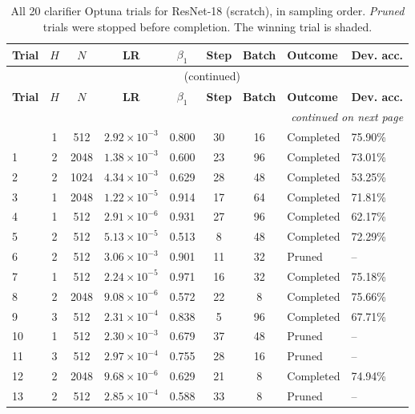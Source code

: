 {\footnotesize
\begin{longtable}{lccccccll}
\caption{All 20 clarifier Optuna trials for ResNet-18 (scratch), in sampling order. \emph{Pruned} trials were stopped before completion. The winning trial is shaded.}
\label{tab:trials_resnet18_scratch} \\
\toprule
\textbf{Trial} & \textbf{$H$} & \textbf{$N$} & \textbf{LR} & \textbf{$\beta_1$} & \textbf{Step} & \textbf{Batch} & \textbf{Outcome} & \textbf{Dev. acc.} \\
\midrule
\endfirsthead
\multicolumn{9}{c}{\tablename\ \thetable{} (continued)} \\
\toprule
\textbf{Trial} & \textbf{$H$} & \textbf{$N$} & \textbf{LR} & \textbf{$\beta_1$} & \textbf{Step} & \textbf{Batch} & \textbf{Outcome} & \textbf{Dev. acc.} \\
\midrule
\endhead
\midrule
\multicolumn{9}{r}{\emph{continued on next page}} \\
\endfoot
\bottomrule
\endlastfoot
0 & 1 & 512 & $2.92\times10^{-3}$ & 0.800 & 30 & 16 & Completed & 75.90\% \\
1 & 2 & 2048 & $1.38\times10^{-3}$ & 0.600 & 23 & 96 & Completed & 73.01\% \\
2 & 2 & 1024 & $4.34\times10^{-3}$ & 0.629 & 28 & 48 & Completed & 53.25\% \\
3 & 1 & 2048 & $1.22\times10^{-5}$ & 0.914 & 17 & 64 & Completed & 71.81\% \\
4 & 1 & 512 & $2.91\times10^{-6}$ & 0.931 & 27 & 96 & Completed & 62.17\% \\
5 & 2 & 512 & $5.13\times10^{-5}$ & 0.513 & 8 & 48 & Completed & 72.29\% \\
6 & 2 & 512 & $3.06\times10^{-3}$ & 0.901 & 11 & 32 & Pruned & -- \\
7 & 1 & 512 & $2.24\times10^{-5}$ & 0.971 & 16 & 32 & Completed & 75.18\% \\
8 & 2 & 2048 & $9.08\times10^{-6}$ & 0.572 & 22 & 8 & Completed & 75.66\% \\
9 & 3 & 512 & $2.31\times10^{-4}$ & 0.838 & 5 & 96 & Completed & 67.71\% \\
10 & 1 & 512 & $2.30\times10^{-3}$ & 0.679 & 37 & 48 & Pruned & -- \\
11 & 3 & 512 & $2.97\times10^{-4}$ & 0.755 & 28 & 16 & Pruned & -- \\
12 & 2 & 2048 & $9.68\times10^{-6}$ & 0.629 & 21 & 8 & Completed & 74.94\% \\
13 & 2 & 512 & $2.85\times10^{-4}$ & 0.588 & 33 & 8 & Pruned & -- \\

\end{longtable}}
